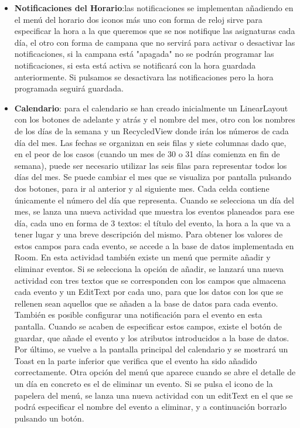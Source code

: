 \documentclass[a4paper,openright,12pt]{article}
\begin{document}
\begin{itemize}
    \item \textbf{Notificaciones del Horario}:las notificaciones se implementan añadiendo en el menú del horario dos iconos más uno con forma de reloj sirve para especificar la hora a la que queremos que se nos notifique las asignaturas cada día, el otro con forma de campana que no servirá para activar o desactivar las notificaciones, si la campana está "apagada" no se podrán programar las notificaciones, si esta está activa se notificará con la hora guardada anteriormente. Si pulsamos se desactivara las notificaciones pero la hora programada seguirá guardada. 
    
\end{itemize}
\begin{itemize}
    \item \textbf{Calendario}:
    para el calendario se han creado inicialmente un LinearLayout con los botones de adelante y atrás y el nombre del mes, otro con los nombres de los días de la semana y un RecycledView donde irán los números de cada día del mes.  \newline
    Las fechas se organizan en seis filas y siete columnas dado que, en el peor de los casos (cuando un mes de 30 o 31 días comienza en fin de semana), puede ser necesario utilizar las seis filas para representar todos los días del mes. Se puede cambiar el mes que se visualiza por pantalla pulsando dos botones, para ir al anterior y al siguiente mes. Cada celda contiene únicamente el número del día que representa.  \newline
    Cuando se selecciona un día del mes, se lanza una nueva actividad que muestra los eventos planeados para ese día, cada uno en forma de 3 textos: el título del evento, la hora a la que va a tener lugar y una breve descripción del mismo. Para obtener los valores de estos campos para cada evento, se accede a la base de datos implementada en Room.  \newline
    En esta actividad también existe un menú que permite añadir y eliminar eventos. Si se selecciona la opción de añadir, se lanzará una nueva actividad con tres textos que se corresponden con los campos que almacena cada evento y un EditText por cada uno, para que los datos con los que se rellenen sean aquellos que se añaden a la base de datos para cada evento. También es posible configurar una notificación para el evento en esta pantalla.  Cuando se acaben de especificar estos campos, existe el botón de guardar, que añade el evento y los atributos introducidos a la base de datos. Por último, se vuelve a la pantalla principal del calendario y se mostrará un Toast en la parte inferior que verifica que el evento ha sido añadido correctamente. \newline
    Otra opción del menú que aparece cuando se abre el detalle de un día en concreto es el de eliminar un evento. Si se pulsa el icono de la papelera del menú, se lanza una nueva actividad con un editText en el que se podrá especificar el nombre del evento a eliminar, y a continuación borrarlo pulsando un botón.
    
\end{itemize}
\end{document}

